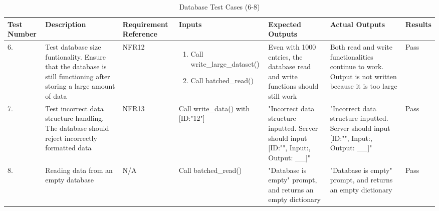 \documentclass[12pt, titlepage]{article}
\begin{document}
\begin{center}
    \begin{table}[H]
        \centering
        \begin{tabular}{|p{1cm}|p{2.2cm}|p{2.5cm}|p{2.7cm}|p{2.4cm}|p{2.4cm}|p{1.3cm}|}
        \hline
        \bf Test Number & \bf Description & \bf Requirement Reference & \bf Inputs & \bf Expected Outputs & \bf Actual Outputs & \bf Results \\
        \hline
        6. & Test database size funtionality. Ensure that the database is still functioning after storing a large amount of data & NFR12 & \begin{enumerate}
            \item Call write\_lar\newline ge\_\newline dataset()
            \item Call batched\_\newline read()
        \end{enumerate} & Even with 1000 entries, the database read and write functions should still work & Both read and write functionalities continue to work. Output is not written because it is too large & Pass\\
        \hline
        7. & Test incorrect data structure handling. The database should reject incorrectly formatted data & NFR13 & Call write\_data() with [ID:"12"] & "Incorrect data structure inputted. Server should input [ID:"", Input:{}, Output: \_\_]" & "Incorrect data structure inputted. Server should input [ID:"", Input:{}, Output: \_\_]" & Pass\\
        \hline
        8. & Reading data from an empty database & N/A & Call batched\_read() & "Database is empty" prompt, and returns an empty dictionary & "Database is empty" prompt, and returns an empty dictionary & Pass\\
        \hline
        \end{tabular}
        \caption{Database Test Cases (6-8)}
        \label{tab:my_label14}
    \end{table}
\end{center}
\end{document}
